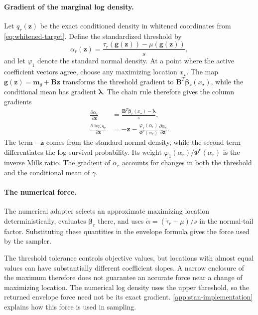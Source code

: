 \paragraph{Gradient of the marginal log density.}
Let $q_r(\boldsymbol z)$ be the exact conditioned density in whitened
coordinates from \cref{eq:whitened-target}. Define the standardized
threshold by
\[
 \alpha_r(\boldsymbol z)
 =\frac{\tau_r(\boldsymbol g(\boldsymbol z))
          -\mu(\boldsymbol g(\boldsymbol z))}{s},
\]
and let $\varphi_1$ denote the standard normal density.
At a point where the active coefficient vectors agree, choose any
maximizing location $x_\star$. The map
$\boldsymbol g(\boldsymbol z)=\boldsymbol m_g+\boldsymbol B\boldsymbol z$
transforms the threshold gradient to
$\boldsymbol B^T\boldsymbol\beta_r(x_\star)$, while the conditional
mean has gradient $\boldsymbol\lambda$. The chain rule therefore gives
the column gradients
\begin{equation}\label{eq:target-gradient}
 \begin{aligned}
 \frac{\partial\alpha_r}{\partial\boldsymbol z}
   &=\frac{\boldsymbol B^T\boldsymbol\beta_r(x_\star)-\boldsymbol\lambda}{s},\\
 \frac{\partial\log q_r}{\partial\boldsymbol z}
   &=-\boldsymbol z-
       \frac{\varphi_1(\alpha_r)}{\Phi^{\mathrm c}(\alpha_r)}
       \frac{\partial\alpha_r}{\partial\boldsymbol z}.
 \end{aligned}
\end{equation}
The term $-\boldsymbol z$ comes from the standard normal density,
while the second term differentiates the log survival probability.
Its weight $\varphi_1(\alpha_r)/\Phi^{\mathrm c}(\alpha_r)$ is the
inverse Mills ratio. The gradient of $\alpha_r$ accounts for changes
in both the threshold and the conditional mean of $\gamma$.

\paragraph{The numerical force.}
The numerical adapter selects an approximate maximizing location
deterministically, evaluates $\boldsymbol\beta_r$ there, and uses
$\widetilde\alpha=(\widetilde\tau_r-\mu)/s$ in the normal-tail factor.
Substituting these quantities in the envelope formula gives the force
used by the sampler.

The threshold tolerance controls objective values, but locations with
almost equal values can have substantially different coefficient
slopes. A narrow enclosure of the maximum therefore does not guarantee
an accurate force near a change of maximizing location. The numerical
log density uses the upper threshold, so the returned envelope force need
not be its exact gradient. \cref{app:stan-implementation} explains how
this force is used in sampling.

